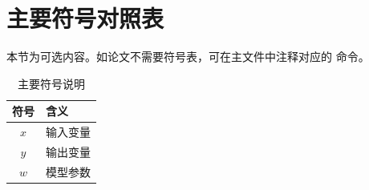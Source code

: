 \chapter{主要符号对照表}

本节为可选内容。如论文不需要符号表，可在主文件中注释对应的 \verb|| 命令。

\begin{table}[htbp]
  \centering
  \caption{主要符号说明}
  \begin{tabular}{cl}
    \toprule
    符号 & 含义 \\
    \midrule
    $x$ & 输入变量 \\
    $y$ & 输出变量 \\
    $w$ & 模型参数 \\
    \bottomrule
  \end{tabular}
\end{table}
